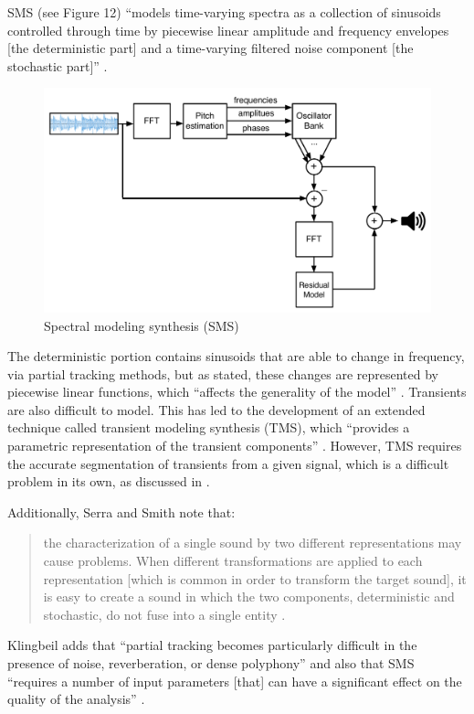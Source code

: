 \documentclass[12pt]{report} 	%
\numberwithin{figure}{chapter}
\numberwithin{table}{chapter}
\numberwithin{equation}{chapter}
\begin{document}
\begin{flushleft}
SMS (see Figure 12) ``models time-varying spectra as a collection of sinusoids controlled through time by piecewise linear amplitude and frequency envelopes [the deterministic part] and a time-varying filtered noise component [the stochastic part]'' \cite[p. 12]{Serra:1990dk}. 
\begin{figure}[h!]
\vspace{24pt}
\begin{center}
\includegraphics[scale=0.55]{SMS}
\caption[SMS]{Spectral modeling synthesis (SMS)}
\end{center}
\vspace{6pt}
\end{figure}
The deterministic portion contains sinusoids that are able to \newpage
\noindent change in frequency, via partial tracking methods, but as stated, these changes are represented by piecewise linear functions, which ``affects the generality of the model'' \cite[p. 31]{Tolonen:1998bh}. Transients are also difficult to model. This has led to the development of an extended technique called transient modeling synthesis (TMS), which ``provides a parametric representation of the transient components'' \cite[p. 33]{Tolonen:1998bh}. However, TMS requires the accurate segmentation of transients from a given signal, which is a difficult problem in its own, as discussed in \cite[p. 16]{Ciglar:2009uf}. \begin{singlespace}
\noindent Additionally, Serra and Smith note that:
\begin{quote}
\selectfont
the characterization of a single sound by two different representations may cause problems. When different transformations are applied to each representation [which is common in order to transform the target sound], it is easy to create a sound in which the two components, deterministic and stochastic, do not fuse into a single entity \cite[p. 23]{Serra:1990dk}.
\end{quote}
\selectfont
\end{singlespace}
Klingbeil adds that ``partial tracking becomes particularly difficult in the presence of noise, reverberation, or dense polyphony'' and also that SMS ``requires a number of input parameters [that] can have a significant effect on the quality of the analysis'' \cite[p. 42]{Klingbeil:2009lo}.


\end{flushleft}
\end{document}
